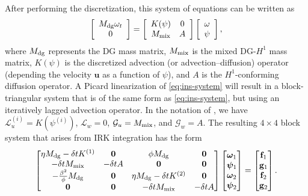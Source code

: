 \documentclass[review]{siamart}
\begin{document}
After performing the discretization, this system of equations can be written as
\begin{equation}
	\label{eq:ins-system}
	\left[ \begin{array}{c} M_{\rm dg} \omega_t \\ 0 \end{array} \right]
	=
	\left[ \begin{array}{cc} K(\psi) & 0 \\ M_{\rm mix} & A \end{array} \right]
	\left[ \begin{array}{c} \omega \\ \psi \end{array} \right],
\end{equation}
where $M_{\rm dg}$ represents the DG mass matrix, $M_{\rm mix}$ is the mixed DG-$H^1$ mass matrix, $K(\psi)$ is the discretized advection (or advection--diffusion) operator (depending the velocity $\bm u$ as a function of $\psi$), and $A$ is the $H^1$-conforming diffusion operator.
A Picard linearization of \eqref{eq:ins-system} will result in a block-triangular system that is of the same form as \eqref{eq:ins-system}, but using an iteratively lagged advection operator.
In the notation of , we have $\mathcal{L}_u^{(i)} = K(\psi^{(i)})$, $\mathcal{L}_w = 0$, $\mathcal{G}_u = M_{\rm mix}$, and $\mathcal{G}_w = A$.
The resulting $4\times4$ block system that arises from IRK integration has the form
\begin{align} \label{eq:vsf-system-1}
	\begin{bmatrix}
		\eta M_{\rm dg} - \delta t K^{(1)} & \mathbf{0} & \phi M_{\rm dg} & \mathbf{0} \\
		-\delta t M_{\rm mix} & -\delta t A & \mathbf{0} & \mathbf{0} \\
		-\tfrac{\beta^2}{\phi}M_{\rm dg} & \mathbf{0} & \eta M_{\rm dg} - \delta t K^{(2)} & \mathbf{0} \\
		\mathbf{0} & \mathbf{0} & -\delta t M_{\rm mix} & -\delta t A
	\end{bmatrix}
	\begin{bmatrix} \bm\omega_1 \\ \bm\psi_1 \\ \bm\omega_2 \\ \bm\psi_2 \end{bmatrix}
	=
	\begin{bmatrix} \mathbf{f}_1 \\ \mathbf{g}_1 \\ \mathbf{f}_2 \\ \mathbf{g}_2 \end{bmatrix}.
\end{align}
\end{document}
